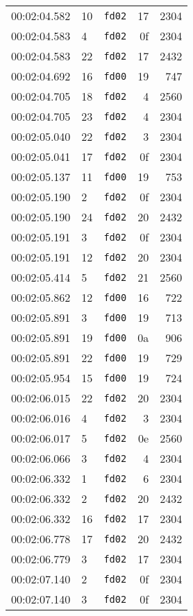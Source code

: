 \documentclass{article}
\begin{document}
\begin{longtable}{lllrr}
00:02:04.582 & 10 & \texttt{fd02} & 17 & 2304 \\
00:02:04.583 & 4 & \texttt{fd02} & 0f & 2304 \\
00:02:04.583 & 22 & \texttt{fd02} & 17 & 2432 \\
00:02:04.692 & 16 & \texttt{fd00} & 19 & 747 \\
00:02:04.705 & 18 & \texttt{fd02} & 4 & 2560 \\
00:02:04.705 & 23 & \texttt{fd02} & 4 & 2304 \\
00:02:05.040 & 22 & \texttt{fd02} & 3 & 2304 \\
00:02:05.041 & 17 & \texttt{fd02} & 0f & 2304 \\
00:02:05.137 & 11 & \texttt{fd00} & 19 & 753 \\
00:02:05.190 & 2 & \texttt{fd02} & 0f & 2304 \\
00:02:05.190 & 24 & \texttt{fd02} & 20 & 2432 \\
00:02:05.191 & 3 & \texttt{fd02} & 0f & 2304 \\
00:02:05.191 & 12 & \texttt{fd02} & 20 & 2304 \\
00:02:05.414 & 5 & \texttt{fd02} & 21 & 2560 \\
00:02:05.862 & 12 & \texttt{fd00} & 16 & 722 \\
00:02:05.891 & 3 & \texttt{fd00} & 19 & 713 \\
00:02:05.891 & 19 & \texttt{fd00} & 0a & 906 \\
00:02:05.891 & 22 & \texttt{fd00} & 19 & 729 \\
00:02:05.954 & 15 & \texttt{fd00} & 19 & 724 \\
00:02:06.015 & 22 & \texttt{fd02} & 20 & 2304 \\
00:02:06.016 & 4 & \texttt{fd02} & 3 & 2304 \\
00:02:06.017 & 5 & \texttt{fd02} & 0e & 2560 \\
00:02:06.066 & 3 & \texttt{fd02} & 4 & 2304 \\
00:02:06.332 & 1 & \texttt{fd02} & 6 & 2304 \\
00:02:06.332 & 2 & \texttt{fd02} & 20 & 2432 \\
00:02:06.332 & 16 & \texttt{fd02} & 17 & 2304 \\
00:02:06.778 & 17 & \texttt{fd02} & 20 & 2432 \\
00:02:06.779 & 3 & \texttt{fd02} & 17 & 2304 \\
00:02:07.140 & 2 & \texttt{fd02} & 0f & 2304 \\
00:02:07.140 & 3 & \texttt{fd02} & 0f & 2304 \\

\end{longtable}
\end{document}
